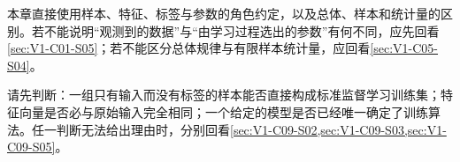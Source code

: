
\begin{prerequisitebox}\label{schema:V1-C09:CH-02}
本章直接使用样本、特征、标签与参数的角色约定，以及总体、样本和统计量的区别。若不能说明“观测到的数据”与“由学习过程选出的参数”有何不同，应先回看\cref{sec:V1-C01-S05}；若不能区分总体规律与有限样本统计量，应回看\cref{sec:V1-C05-S04}。
\end{prerequisitebox}

\begin{precheckbox}\label{schema:V1-C09:CH-03}\normalfont\unboldmath
请先判断：一组只有输入而没有标签的样本能否直接构成标准监督学习训练集；特征向量是否必与原始输入完全相同；一个给定的模型是否已经唯一确定了训练算法。任一判断无法给出理由时，分别回看\cref{sec:V1-C09-S02,sec:V1-C09-S03,sec:V1-C09-S05}。
\end{precheckbox}

